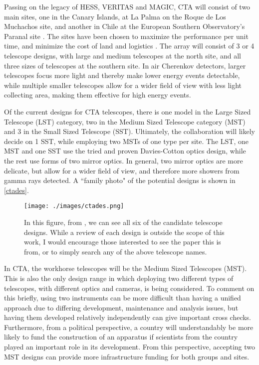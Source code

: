 Passing on the legacy of HESS, VERITAS and MAGIC, CTA will consist of two main sites, one in the Canary Islands, at La Palma on the Roque de Los Muchachos site, and another in Chile at the European Southern Observatory's Paranal site \cite{ctaong}. The sites have been chosen to maximize the performance per unit time, and minimize the cost of land and logistics \cite{tarek}. The array will consist of 3 or 4 telescope designs, with large and medium telescopes at the north site, and all three sizes of telescopes at the southern site. In air Cherenkov detectors, larger telescopes focus more light and thereby make lower energy events detectable, while multiple smaller telescopes allow for a wider field of view with less light collecting area, making them effective for high energy events.

Of the current designs for CTA telescopes, there is one model in the Large Sized Telescope (LST) category, two in the Medium Sized Telescope category (MST) and 3 in the Small Sized Telescope (SST). Ultimately, the collaboration will likely decide on 1 SST, while employing two MSTs of one type per site. The LST, one MST and one SST use the tried and proven Davies-Cotton optics design, while the rest use forms of two mirror optics. In general, two mirror optics are more delicate, but allow for a wider field of view, and therefore more showers from gamma rays detected. A ``family photo" of the potential designs is shown in \autoref{ctades}.

\begin{figure}[h!]
\begin{center}
\texttt{[image: ./images/ctades.png]}
\caption[CTA Telescope Candidates]{In this figure, from \textcite{ctaong}, we can see all six of the candidate telescope designs. While a review of each design is outside the scope of this work, I would encourage those interested to see the paper this is from, or to simply search any of the above telescope names.}
\label{ctades}
\end{center}
\end{figure}

In CTA, the workhorse telescopes will be the Medium Sized Telescopes (MST). This is also the only design range in which deploying two different types of telescopes, with different optics and cameras, is being considered. To comment on this briefly, using two instruments can be more difficult than having a unified approach due to differing development, maintenance and analysis issues, but having them developed relatively independently can give important cross checks. Furthermore, from a political perspective, a country will understandably be more likely to fund the construction of an apparatus if scientists from the country played an important role in its development. From this perspective, accepting two MST designs can provide more infrastructure funding for both groups and sites.

